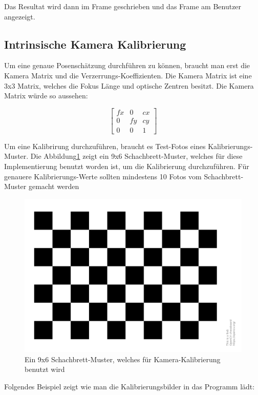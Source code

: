 Das Resultat wird dann im Frame geschrieben und das Frame am Benutzer angezeigt.

\subsection{Intrinsische Kamera Kalibrierung}

Um eine genaue Posenschätzung durchführen zu können, braucht man erst die Kamera Matrix und die Verzerrungs-Koeffizienten. 
Die Kamera Matrix ist eine 3x3 Matrix, welches die Fokus Länge und optische Zentren besitzt. 
Die Kamera Matrix würde so aussehen:

\[
\begin{bmatrix}
fx & 0 & cx \\ 
0 & fy & cy \\ 
0 & 0  & 1 
\end{bmatrix}
\]

Um eine Kalibrirung durchzuführen, braucht es Test-Fotos eines Kalibrierungs-Muster. 
Die Abbildung\ref{fig:pattern} zeigt ein 9x6 Schachbrett-Muster, welches für diese Implementierung benutzt worden ist, um die Kalibrierung durchzuführen.
Für genauere Kalibrierungs-Werte sollten mindestens 10 Fotos vom Schachbrett-Muster gemacht werden \cite{noauthor_opencv_nodate-2}


\begin{figure}[H]
    \centering
    \includegraphics[width=0.5\linewidth]{graphics/pattern.png}
    \caption{Ein 9x6 Schachbrett-Muster, welches für Kamera-Kalibrierung benutzt wird}
    \label{fig:pattern}
\end{figure}

Folgendes Beispiel zeigt wie man die Kalibrierungsbilder in das Programm lädt:


